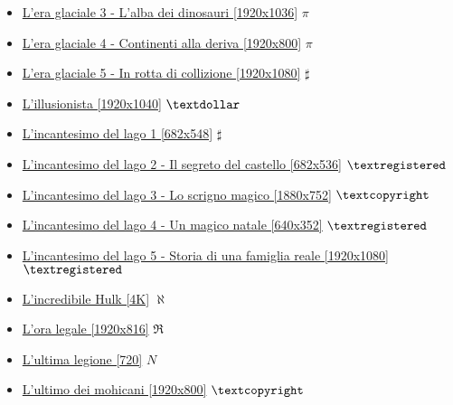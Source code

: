 \begin{itemize}
			\item \href{https://mega.nz/#!kRwHAL7L!0hPEZBxp7M8OjnnEQFe4d3KYHJGY3PfYtq7ofsFkkVQ} {L'era glaciale 3 - L'alba dei dinosauri [1920x1036]}  $\pi$ \\
			\item \href{https://mega.nz/#!1E52BYzT!WYN0d0peUW1wIedgNM1V2-byVOujmxaRHRrtHYGUaxc} {L'era glaciale 4 - Continenti alla deriva [1920x800]}  $\pi$ \\ 
			\item \href{https://mega.nz/#!p7gHnBSQ!upLr_2qwMwH8gu3fsrCBfcdwkEM23B8v-LLbQc7QMho} {L'era glaciale 5 - In rotta di collizione [1920x1080]}  $\sharp$ \\
			\item \href{https://mega.nz/#!brxDHaiR!EPEyR_70UuK-w3RV8rV-S0RTl-eDz416kVtMk7kRImI} {L'illusionista [1920x1040]}  $\textdollar$ \\ 
			\item \href{https://mega.nz/#!pjp2QS4Z!wSaJVZtZQ7U24vsVxhaWmie_gsmQiSForcbvq6GqxhA} {L'incantesimo del lago 1 [682x548]}  $\sharp$ \\ 
			\item \href{https://mega.nz/#!v74lkDRb!7QGmAiZmu3wY7mr_dl5iQFaatCXK-V6v0QUTK8DP-os} {L'incantesimo del lago 2 - Il segreto del castello [682x536]}  $\textregistered$ \\ 
			\item \href{https://mega.nz/#!mSxBCRJa!0pimNaLCdLUNBVDRMT7sd0xF0fv_SVG-MK4daSQsfLg} {L'incantesimo del lago 3 - Lo scrigno magico [1880x752]}  $\textcopyright$ \\ 
			\item \href{https://mega.nz/#!avZRyILb!VcitALA9tsx9Py-MaEYWyAjUaOhzADZapH-_NdIDM6M} {L'incantesimo del lago 4 - Un magico natale [640x352]}  $\textregistered$ \\ 
			\item \href{https://mega.nz/#!T6oF2TIB!6biPOUJj_HHDX_zILVE_aIZIkK7EIu1El-4obWCLJjY} {L'incantesimo del lago 5 - Storia di una famiglia reale [1920x1080]}  $\textregistered$ \\ 
			\item \href{https://mega.nz/#!DKRETQDK!Mdky58F4aYwefZkfZJD4SNL-JWcpT0PWOn8SAwll1kA} {L'incredibile Hulk [4K]}  $\aleph$ \\ 
			\item \href{https://mega.nz/#!Cb4kUSSY!LVgElCBoeOT7Ko4MAZ76Cuh3_l-K7lfRS0jnQuZ7OC4} {L'ora legale [1920x816]}  $\Re$ \\ 
			\item \href{https://mega.nz/#!VGBH3CYZ!AqDlhytioaSTkxKhV1F8rL16tekKHPSh-vkZN8KmPmk} {L'ultima legione [720]}  $N$ \\ 
			\item \href{https://mega.nz/#!GehXwbgY!CqP-x1KUD8TyD2a1QrT_zsSTPs1xLDxdHt6Vhm0AHz8} {L'ultimo dei mohicani [1920x800]}  $\textcopyright$ \\
			
		
		\end{itemize}
		

